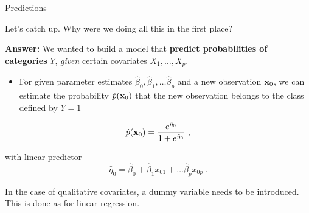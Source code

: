 \documentclass[10pt,ignorenonframetext,]{beamer}
\providecommand{\tightlist}{%
  \setlength{\itemsep}{0pt}\setlength{\parskip}{0pt}}
\begin{document}
\begin{frame}

\begin{block}{Predictions}

\vspace{2mm}

Let's catch up. Why were we doing all this in the first place?

\vspace{2mm}

\textbf{Answer:} We wanted to build a model that \textbf{predict
probabilities of categories} \(Y\), \emph{given} certain covariates
\(X_1, \ldots, X_p\).

\vspace{4mm}

\begin{itemize}
\tightlist
\item
  For given parameter estimates
  \(\hat\beta_0, \hat\beta_1, \ldots \hat\beta_p\) and a new observation
  \({\bf x}_0\), we can estimate the probability \(\hat{p}({\bf x}_0)\)
  that the new observation belongs to the class defined by \(Y=1\)
\end{itemize}

\[\hat{p}({\bf x}_0) = \frac{e^{\hat{\eta}_0}}{1+e^{\hat{\eta}_0}} \ , \]

with linear predictor
\[\hat\eta_0 = \hat\beta_0 + \hat\beta_1 x_{01} + \ldots \hat\beta_p x_{0p} \ .\]

In the case of qualitative covariates, a dummy variable needs to be
introduced. This is done as for linear regression.

\end{block}

\end{frame}
\end{document}
